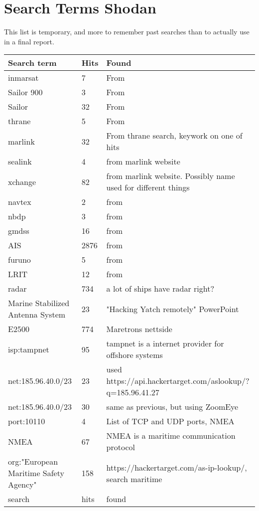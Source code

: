 

\section{Search Terms Shodan} \label{sec:search_term}
This list is temporary, and more to remember past searches than to actually use in a final report.
\begin{table}[H]
\centering
\begin{tabular}{|l|l|l|}
\hline
Search term & Hits & Found \\ \hline
inmarsat & 7 & From \cite{maritime_pen_test} \\ \hline
Sailor 900 & 3 & From \cite{maritime_pen_test} \\ \hline
Sailor & 32 & From \cite{maritime_pen_test} \\ \hline
thrane & 5 & From \cite{maritime_pen_test} \\ \hline
marlink & 32 &  From thrane search, keywork on one of hits \\ \hline
sealink & 4 &  from marlink website\\ \hline
xchange & 82 &  from marlink website. Possibly name used for different things\\ \hline
navtex & 2 &  from \cite{maritime_digitalization}\\ \hline
nbdp & 3 &  from \cite{maritime_digitalization}\\ \hline
gmdss & 16 &  from \cite{maritime_digitalization}\\ \hline
AIS & 2876 &  from \cite{maritime_digitalization}\\ \hline
furuno & 5 &  from \cite{maritime_digitalization}\\ \hline
LRIT & 12 &  from \cite{maritime_digitalization}\\ \hline
radar & 734 &  a lot of ships have radar right?\\ \hline
Marine Stabilized Antenna System & 23 &  "Hacking Yatch remotely" PowerPoint\\ \hline
E2500 & 774 &  Maretrons nettside\\ \hline
isp:tampnet & 95 &  tampnet is a internet provider for offshore systems\\ \hline
net:185.96.40.0/23 & 23 &  used https://api.hackertarget.com/aslookup/?q=185.96.41.27\\ \hline
net:185.96.40.0/23 & 30 &  same as previous, but using ZoomEye\\ \hline
port:10110 & 4 &  List of TCP and UDP ports, NMEA\\ \hline
NMEA & 67 &  NMEA is a maritime communication protocol\\ \hline

org:"European Maritime Safety Agency" & 158 &  https://hackertarget.com/as-ip-lookup/, search maritime\\ \hline
search & hits &  found\\ \hline
\end{tabular}
\end{table}


